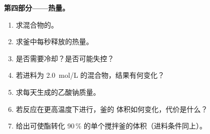 \begin{problem}
\medskip
\noindent\textbf{第四部分——热量。}
\begin{enumerate}[resume]
  \item 求混合物的。
  \item 求釜中每秒释放的热量。
  \item 是否需要冷却？是否可能失控？
  \item 若进料为 \qty{2.0}{mol/L} 的混合物，结果有何变化？
  \item 求每天生成的乙酸钠质量。
  \item 若反应在更高温度下进行，釜的
        体积如何变化，代价是什么？
  \item 给出可使酯转化 90\,\%
        的单个搅拌釜的体积（进料条件同上）。
\end{enumerate}
\end{problem}
